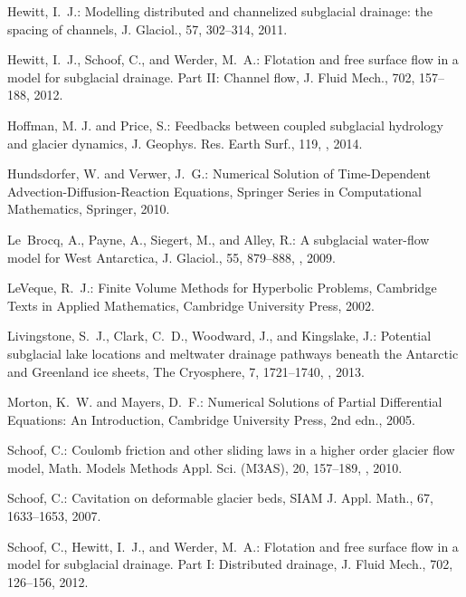 \documentclass[11pt,reqno]{amsart}
\begin{document}
\begin{thebibliography}{}
Hewitt, I.~J.: Modelling distributed and channelized subglacial drainage: the
  spacing of channels, J. Glaciol., 57, 302--314, 2011.

Hewitt, I.~J., Schoof, C., and Werder, M.~A.: Flotation and free surface flow
  in a model for subglacial drainage. {P}art {II}: {C}hannel flow, J. Fluid
  Mech., 702, 157--188, 2012.

Hoffman, M. J. and Price, S.: Feedbacks between coupled subglacial hydrology and glacier dynamics, J. Geophys. Res. Earth Surf., 119, , 2014.

Hundsdorfer, W. and Verwer, J.~G.: Numerical {S}olution of {T}ime-{D}ependent
  {A}dvection-{D}iffusion-{R}eaction {E}quations, Springer Series in
  Computational Mathematics, Springer, 2010.

Le~Brocq, A., Payne, A., Siegert, M., and Alley, R.: A subglacial water-flow
  model for {W}est {A}ntarctica, J. Glaciol., 55, 879--888,
  , 2009.

LeVeque, R.~J.: Finite Volume Methods for Hyperbolic Problems, Cambridge Texts
  in Applied Mathematics, Cambridge University Press, 2002.

Livingstone, S.~J., Clark, C.~D., Woodward, J., and Kingslake, J.: Potential
  subglacial lake locations and meltwater drainage pathways beneath the
  {A}ntarctic and {G}reenland ice sheets, The Cryosphere, 7, 1721--1740,
  , 2013.

Morton, K.~W. and Mayers, D.~F.: Numerical {S}olutions of {P}artial
  {D}ifferential {E}quations: {A}n {I}ntroduction, Cambridge University Press,
  2nd edn., 2005.

Schoof, C.: Coulomb friction and other sliding laws in a higher order glacier
  flow model, Math. Models Methods Appl. Sci. (M3AS), 20, 157--189,
  , 2010{}.

Schoof, C.: Cavitation on deformable glacier beds, SIAM J. Appl. Math., 67,
  1633--1653, 2007.

Schoof, C., Hewitt, I.~J., and Werder, M.~A.: Flotation and free surface flow
  in a model for subglacial drainage. {P}art {I}: {D}istributed drainage, J.
  Fluid Mech., 702, 126--156, 2012.


\end{thebibliography}
\end{document}

